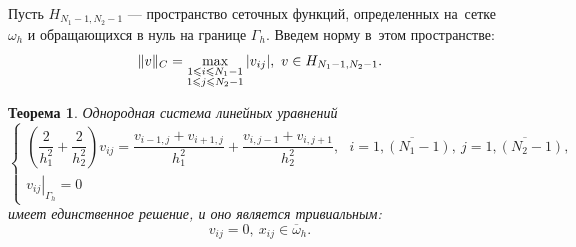 \documentclass[11pt,a4paper,twoside]{report}
\numberwithin{equation}{section}
\theoremstyle{definition}
\theoremstyle{plain}
\newtheorem{theorem}{Теорема}[section]
\DeclarePairedDelimiter\norm{\lVert}{\rVert}
\begin{document}
Пусть $H_{N_1-1, N_2-1}$ — пространство сеточных функций, определенных
на~сетке $\omega_h$ и обращающихся в нуль на границе $\Gamma_h$.
Введем норму в~этом пространстве:
    $$
        \norm{v}_C = \max_{\substack{1 \leqslant i \leqslant N_1 - 1\\
        1 \leqslant j \leqslant N_2 - 1}} |v_{ij}|,~v\in H_{N_1 - 1, N_2 - 1}.
    $$
%
\begin{theorem}
    Однородная система линейных уравнений
    $$
        \begin{cases}
            \left(\dfrac{2}{h_1^2} + \dfrac{2}{h_2^2}\right)v_{ij} =
                \dfrac{v_{i-1,j} + v_{i+1,j}}{h_1^2} +
                \dfrac{v_{i,j-1} + v_{i,j+1}}{h_2^2},~~~
            i=\overline{1,(N_1-1)},~j=\overline{1,(N_2-1)},\\
            \left.v_{ij}\right\vert_{\Gamma_h}=0
        \end{cases}
    $$
    имеет единственное решение, и оно является тривиальным:
    $$
        v_{ij} = 0,~x_{ij} \in \overline{\omega}_h.
    $$
\end{theorem}
%
%
\end{document}
